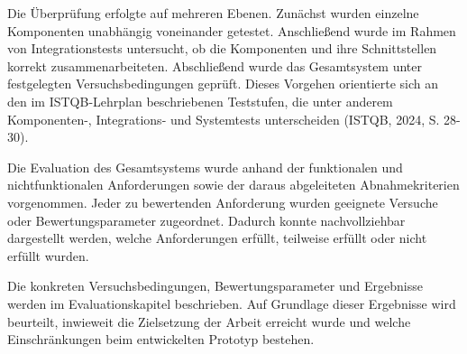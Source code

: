 Die Überprüfung erfolgte auf mehreren Ebenen. Zunächst wurden einzelne Komponenten unabhängig voneinander getestet. Anschließend wurde im Rahmen von Integrationstests untersucht, ob die Komponenten und ihre Schnittstellen korrekt zusammenarbeiteten. Abschließend wurde das Gesamtsystem unter festgelegten Versuchsbedingungen geprüft. Dieses Vorgehen orientierte sich an den im ISTQB-Lehrplan beschriebenen Teststufen, die unter anderem Komponenten-, Integrations- und Systemtests unterscheiden (ISTQB, 2024, S. 28-30).

Die Evaluation des Gesamtsystems wurde anhand der funktionalen und nichtfunktionalen Anforderungen sowie der daraus abgeleiteten Abnahmekriterien vorgenommen. Jeder zu bewertenden Anforderung wurden geeignete Versuche oder Bewertungsparameter zugeordnet. Dadurch konnte nachvollziehbar dargestellt werden, welche Anforderungen erfüllt, teilweise erfüllt oder nicht erfüllt wurden.

Die konkreten Versuchsbedingungen, Bewertungsparameter und Ergebnisse werden im Evaluationskapitel beschrieben. Auf Grundlage dieser Ergebnisse wird beurteilt, inwieweit die Zielsetzung der Arbeit erreicht wurde und welche Einschränkungen beim entwickelten Prototyp bestehen.

